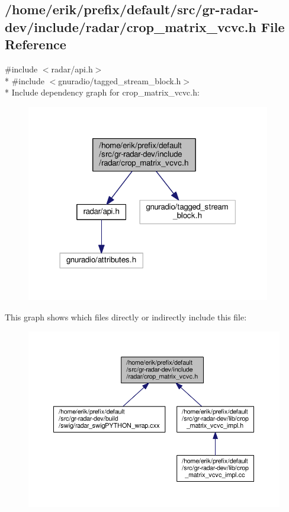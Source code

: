 \subsection{/home/erik/prefix/default/src/gr-\/radar-\/dev/include/radar/crop\+\_\+matrix\+\_\+vcvc.h File Reference}
\label{crop__matrix__vcvc_8h}
{\ttfamily \#include $<$radar/api.\+h$>$}\\*
{\ttfamily \#include $<$gnuradio/tagged\+\_\+stream\+\_\+block.\+h$>$}\\*
Include dependency graph for crop\+\_\+matrix\+\_\+vcvc.\+h\+:
\nopagebreak
\begin{figure}[H]
\begin{center}
\leavevmode
\includegraphics[width=302pt]{de/d5b/crop__matrix__vcvc_8h__incl}
\end{center}
\end{figure}
This graph shows which files directly or indirectly include this file\+:
\nopagebreak
\begin{figure}[H]
\begin{center}
\leavevmode
\includegraphics[width=350pt]{d9/d2f/crop__matrix__vcvc_8h__dep__incl}
\end{center}
\end{figure}
